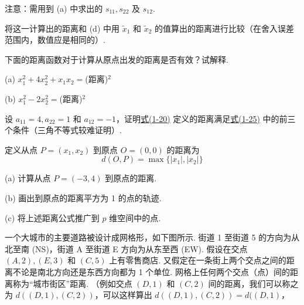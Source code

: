 注意：需用到 (a) 中求出的 $s_{11}, s_{22}$ 及 $s_{12}$.

将这一计算出的距离和 (d) 中用 $\tilde{x}_1$ 和 $\tilde{x}_2$ 的值算出的距离进行比较（在舍入误差范围内，数值应是相同的）.

 下面的距离函数对于计算从原点出发的距离是否有效？试解释.

(a) $x_1^2 + 4x_2^2 + x_1x_2 = $(距离)$^2$

(b) $x_1^2 - 2x_2^2 = $(距离)$^2$

 设 $a_{11} = 4, a_{22} = 1$ 和 $a_{12} = -1$，证明\hyperref[eq:1-20]{式(1-20)} 定义的距离满足\hyperref[eq:1-25]{式(1-25)} 中的前三个条件（三角不等式较难证明）.

 定义从点 $P = (x_1, x_2)$ 到原点 $O = (0, 0)$ 的距离为
\[
d(O, P) = \max\{|x_1|, |x_2|\}
\]

(a) 计算从点 $P = (-3, 4)$ 到原点的距离.

(b) 画出到原点的距离平方为 1 的点的轨迹.

(c) 将上述距离公式推广到 $p$ 维空间中的点.

 一个大城市的主要道路被设计成网格形，如下图所示. 街道 1 至街道 5 的方向为从北至南 (NS)，街道 A 至街道 E 方向为从东至西 (EW). 假设在交点 $(A, 2), (E, 3)$ 和 $(C, 5)$ 上有零售商店. 又假定在一条街上两个交点之间的距离不论是南北方向还是东西方向都为 1 个单位. 网格上任何两个交点（点）间的距离称为“城市街区”距离. （例如交点 $(D, 1)$ 和 $(C, 2)$ 间的距离，我们可以称之为 $d((D, 1), (C, 2))$，可以这样算出 $d((D, 1), (C, 2)) = d((D, 1)$，
